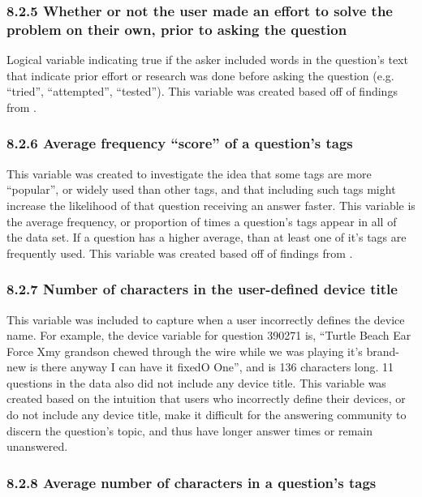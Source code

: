 \documentclass{article}
\begin{document}
\subsubsection*{8.2.5 Whether or not the user made an effort to solve the problem on their own, prior to asking the question}

Logical variable indicating true if the asker included words in the question's text that indicate prior effort or research was done before asking the question (e.g. ``tried'', ``attempted'', ``tested''). This variable was created based off of findings from \cite{Bhat2014}. 

\subsubsection*{8.2.6 Average frequency ``score'' of a question's tags}

This variable was created to investigate the idea that some tags are more ``popular'', or widely used than other tags, and that including such tags might increase the likelihood of that question receiving an answer faster. This variable is the average frequency, or proportion of times a question's tags appear in all of the data set. If a question has a higher average, than at least one of it's tags are frequently used. This variable was created based off of findings from \cite{Bhat2014}. 

\subsubsection*{8.2.7 Number of characters in the user-defined device title}

This variable was included to capture when a user incorrectly defines the device name. For example, the device variable for question 390271 is, “Turtle Beach Ear Force Xmy grandson chewed through the wire while we was playing it's brand-new is there anyway I can have it fixedO One”, and is 136 characters long. 11 questions in the data also did not include any device title. This variable was created based on the intuition that users who incorrectly define their devices, or do not include any device title, make it difficult for the answering community to discern the question's topic, and thus have longer answer times or remain unanswered.

\subsubsection*{8.2.8 Average number of characters in a question's tags}
\end{document}
